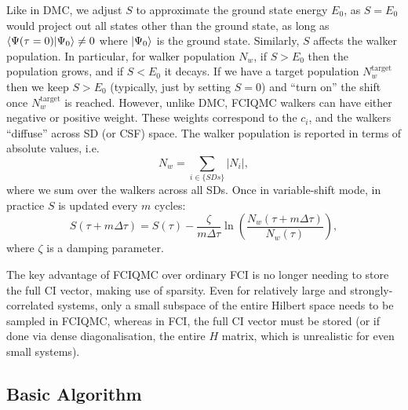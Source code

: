 Like in \gls{DMC}, we adjust $S$ to approximate the ground state energy $E_0$, as $S=E_0$ would project out all states other than the ground state, as long as $\braket{\Psi(\tau=0)}{\Psi_0}\neq 0$ where $\ket{\Psi_0}$ is the ground state. Similarly, $S$ affects the walker population. In particular, for walker population $N_w$, if $S>E_0$ then the population grows, and if $S<E_0$ it decays. If we have a target population $N_w^\mathrm{target}$ then we keep $S>E_0$ (typically, just by setting $S=0$) and ``turn on'' the shift once $N_w^\mathrm{target}$ is reached. However, unlike DMC, \gls{FCIQMC} walkers can have either negative or positive weight. These weights correspond to the $c_i$, and the walkers ``diffuse'' across \gls{SD} (or \gls{CSF}) space. The walker population is reported in terms of absolute values, i.e.
\begin{equation}
    N_w = \sum_{i\in\{SDs\}}|N_i|,
\end{equation}
where we sum over the walkers across all \glspl{SD}. Once in variable-shift mode, in practice $S$ is updated every $m$ cycles:
\begin{equation}
    S(\tau+m\Delta\tau) = S(\tau) - \frac{\zeta}{m\Delta\tau}\ln\left(\frac{N_w(\tau+m\Delta\tau)}{N_w(\tau)}\right),
\end{equation}
where $\zeta$ is a damping parameter.

The key advantage of \gls{FCIQMC} over ordinary \gls{FCI} is no longer needing to store the full \gls{CI} vector, making use of sparsity. Even for relatively large and strongly-correlated systems, only a small subspace of the entire Hilbert space needs to be sampled in FCIQMC, whereas in FCI, the full CI vector must be stored (or if done via dense diagonalisation, the entire $H$ matrix, which is unrealistic for even small systems).

\subsection{Basic Algorithm}

